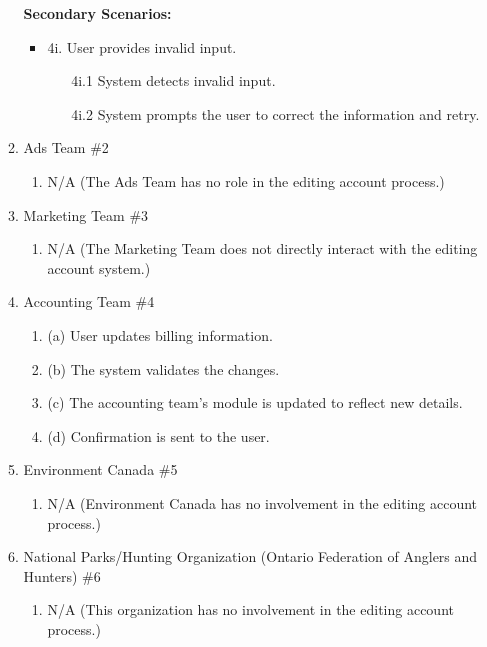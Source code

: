 \documentclass[]{article}
\begin{document}
\begin{enumerate}[{\bf BE1.}]
\begin{enumerate}[{\bf VP1.}]
\textbf{Secondary Scenarios:}
\begin{itemize}
\item 4i. User provides invalid input.
\begin{enumerate}
\item[4i.1] System detects invalid input.
\item[4i.2] System prompts the user to correct the information and retry.
\end{enumerate}
\end{itemize}
 
\item Ads Team \#2 \
\begin{enumerate}
\item N/A (The Ads Team has no role in the editing account process.)
\end{enumerate}
 
\item Marketing Team \#3 \
\begin{enumerate}
\item N/A (The Marketing Team does not directly interact with the editing account system.)
\end{enumerate}
 
\item Accounting Team \#4 \
\begin{enumerate}
\item (a) User updates billing information.
\item (b) The system validates the changes.
\item (c) The accounting team’s module is updated to reflect new details.
\item (d) Confirmation is sent to the user.
\end{enumerate}
 
\item Environment Canada \#5 \
\begin{enumerate}
\item N/A (Environment Canada has no involvement in the editing account process.)
\end{enumerate}
 
\item National Parks/Hunting Organization (Ontario Federation of Anglers and Hunters) \#6 \
\begin{enumerate}
\item N/A (This organization has no involvement in the editing account process.)
\end{enumerate}
\end{enumerate}
 

\end{enumerate}
\end{document}
